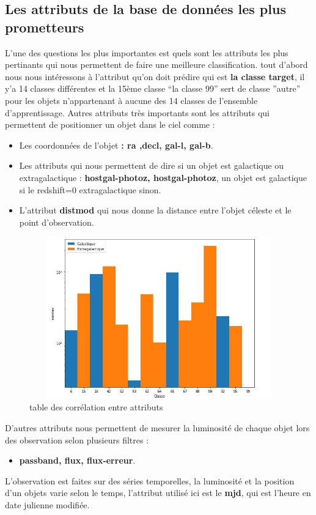 \subsection{Les attributs de la base de données les plus prometteurs}
L’une des questions les plus importantes est quels sont les attributs les plus pertinants qui nous permettent de faire une meilleure classification. tout d’abord nous nous intéressons à l’attribut qu’on doit prédire qui est \textbf{la classe target}, il y’a 14 classes différentes et la 15ème classe “la classe 99” sert de classe ”autre” pour les objets n’appartenant à aucune des 14 classes de l’ensemble d’apprentissage.
\newline
Autres attributs très importants sont les attributs qui permettent de positionner un objet dans le ciel comme :
\begin{itemize}
    \item Les coordonnées de l’objet \textbf{: ra ,decl, gal-l, gal-b}.
    \item Les attributs qui nous permettent de dire si un objet est galactique ou extragalactique :\textbf{ hostgal-photoz, hostgal-photoz}, un objet est galactique si le redshift=0 extragalactique sinon.

    \item L’attribut \textbf{distmod} qui nous donne la distance entre l’objet céleste et le point d’observation.
\end{itemize}

\begin{figure}[!h]
    \centering
    \includegraphics[width=12cm,height=7cm]{report/figures/galactic.jpg}
    \caption{table des corrélation entre attributs}
    \label{fig:my_label}
\end{figure}

\newline
D’autres attributs nous permettent de mesurer la luminosité de chaque objet lors des observation selon plusieurs filtres :
\begin{itemize}
    \item \textbf{passband, flux, flux-erreur}.
\end{itemize}
\newline
L’observation est faites sur des séries temporelles, la luminosité et la position d’un objets varie selon le temps, l’attribut utilisé ici est le \textbf{mjd}, qui est l’heure en date julienne modifiée.

